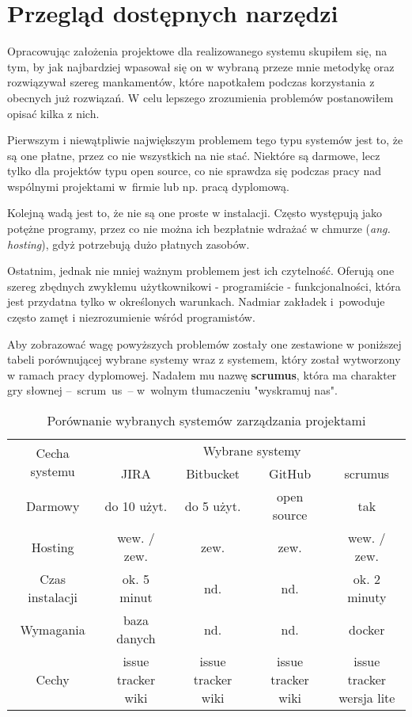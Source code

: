 \section{Przegląd dostępnych narzędzi}
Opracowując założenia projektowe dla realizowanego systemu skupiłem się, na tym, by jak najbardziej wpasował się on w wybraną przeze mnie metodykę oraz rozwiązywał szereg mankamentów, które napotkałem podczas korzystania z obecnych już rozwiązań. W celu lepszego zrozumienia problemów postanowiłem opisać kilka z nich.

Pierwszym i niewątpliwie największym problemem tego typu systemów jest to, że są one płatne, przez co nie wszystkich na nie stać. Niektóre są darmowe, lecz tylko dla projektów typu open source, co nie sprawdza się podczas pracy nad wspólnymi projektami w~firmie lub np. pracą dyplomową.

Kolejną wadą jest to, że nie są one proste w instalacji. Często występują jako potężne programy, przez co nie można ich bezpłatnie wdrażać w chmurze (\textit{ang. hosting}), gdyż potrzebują dużo płatnych zasobów. 

Ostatnim, jednak nie mniej ważnym problemem jest ich czytelność. Oferują one szereg zbędnych zwykłemu użytkownikowi - programiście - funkcjonalności, która jest przydatna tylko w określonych warunkach. Nadmiar zakładek i~powoduje często zamęt i niezrozumienie wśród programistów.

Aby zobrazować wagę powyższych problemów zostały one zestawione w poniższej tabeli porównującej wybrane systemy wraz z systemem, który został wytworzony w ramach pracy dyplomowej. Nadałem mu nazwę \textbf{scrumus}, która ma charakter gry słownej --~scrum~us~-- w~wolnym tłumaczeniu "wyskramuj nas".
\begin{table}[h!]
	\caption{Porównanie wybranych systemów zarządzania projektami}
	\centering
	\begin{tabular}{|c|c|c|c|c|}
		\hline
		\multirow{2}{*}{Cecha systemu} & \multicolumn{4}{c|}{Wybrane systemy} \\\cline{2-5} & JIRA & Bitbucket & GitHub & scrumus\\
		\hline
		Darmowy & do 10 użyt. & do 5 użyt. & open source & tak\\
		\hline
		Hosting & wew. / zew. & zew. & zew. & wew. / zew.\\
		\hline
		Czas instalacji & ok. 5 minut & nd. & nd. & ok. 2 minuty\\
		\hline
		Wymagania & baza danych & nd. & nd. & docker\\
		\hline
		Cechy & \specialcell{issue tracker\\ wiki} & \specialcell{issue tracker\\ wiki} & \specialcell{issue tracker\\ wiki} & \specialcell{issue tracker\\ wersja lite}\\
		\hline
		
	\end{tabular}
	\label{tabela:porownanie_systemow}
\end{table}

